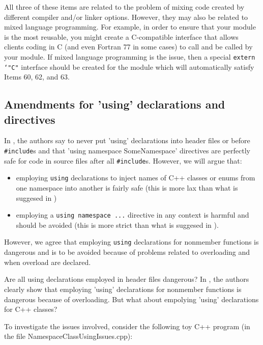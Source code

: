 All three of these items are related to the problem of mixing code created by
different compiler and/or linker options.  However, they may also be related
to mixed language programming.  For example, in order to ensure that your
module is the most reusable, you might create a C-compatible interface that
allows clients coding in C (and even Fortran 77 in some cases) to call and be
called by your module.  If mixed language programming is the issue, then a
special {}\texttt{extern `"C"} interface should be created for the module
which will automatically satisfy Items 60, 62, and 63.

%
\subsection{Amendments for 'using' declarations and directives}
%

In {}\cite[Item 59]{C++CodingStandards05}, the authors say to never put
'using' declarations into header files or before {}\texttt{\#include}s and
that 'using namespace SomeNamespace' directives are perfectly safe for code in
source files after all {}\texttt{\#include}s.  However, we will argue that:

\begin{itemize}

{}\item{}employing {}\texttt{using} declarations to inject names of C++
classes or enums from one namespace into another is fairly safe (this is more
lax than what is suggesed in {}\cite[Item 59]{C++CodingStandards05})

{}\item{}employing a {}\texttt{using namespace ...} directive in any context
is harmful and should be avoided (this is more strict than what is suggesed in
{}\cite[Item 59]{C++CodingStandards05}).

\end{itemize}

{}\noindent{}However, we agree that employing {}\texttt{using} declarations
for nonmember functions is dangerous and is to be avoided because of problems
related to overloading and when overload are declared.

Are all using declarations employed in header files dangerous?  In
{}\cite[Item 59]{C++CodingStandards05}, the authors clearly show that
employing 'using' declarations for nonmember functions is dangerous because of
overloading.  But what about empolying 'using' declarations for C++ classes?

To investigate the issues involved, consider the following toy C++ program (in
the file NamespaceClassUsingIssues.cpp):

